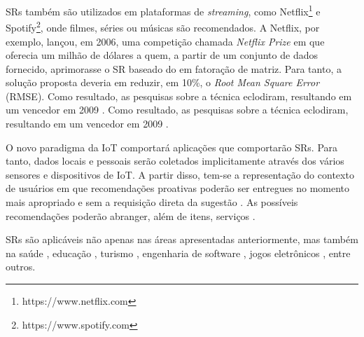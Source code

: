 
SRs também são utilizados em plataformas de \textit{streaming}, como Netflix\textsuperscript{\textregistered}\footnote{https://www.netflix.com} e Spotify\textsuperscript{\textregistered}\footnote{https://www.spotify.com}, onde filmes, séries ou músicas são recomendados. A Netflix\textsuperscript{\textregistered}, por exemplo, lançou, em 2006, uma competição chamada \textit{Netflix Prize} em que oferecia um milhão de dólares a quem, a partir de um conjunto de dados fornecido, aprimorasse o SR baseado do em fatoração de matriz. Para tanto, a solução proposta deveria em  reduzir, em 10\%, o \textit{Root Mean Square Error} (RMSE). Como resultado, as pesquisas sobre a técnica eclodiram, resultando em um vencedor em 2009 \cite{Jannach2016}. Como resultado, as pesquisas sobre a técnica eclodiram, resultando em um vencedor em 2009 \cite{Jannach2016}.

O novo paradigma da IoT comportará aplicações que comportarão SRs. Para tanto, dados locais e pessoais serão coletados implicitamente através dos vários sensores e dispositivos de IoT. A partir disso, tem-se a representação do contexto de usuários em que recomendações proativas poderão ser entregues no momento mais apropriado e sem a requisição direta da sugestão \cite{Salman2015}. As possíveis recomendações poderão abranger, além de itens, serviços \cite {Mashal2015}.


    
SRs são aplicáveis não apenas nas áreas apresentadas anteriormente, mas também na saúde \cite{Ferretto2017}, educação \cite{Wai2016,Montuschi2015}, turismo \cite{Smirnov2013, Frikha2016}, engenharia de software \cite{Hamza2015}, jogos eletrônicos \cite{Berkovsky2010}, entre outros.


